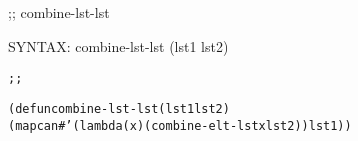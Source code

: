 \begin{aibox}{\function}
;; combine-lst-lst

SYNTAX: combine-lst-lst (lst1 lst2)
\end{aibox}

\begin{aibox}{\examples}
\begin{alltt}
\end{alltt}

\end{aibox}

\begin{aibox}{\comments}

\end{aibox}
\begin{aibox}{\answers}

\end{aibox}
\begin{aibox}{\othercomments}

\end{aibox}
\begin{aibox}{\pseudocode}

\end{aibox}
\begin{aibox}{\code}

\begin{alltt}
;;%% code


(defun combine-lst-lst (lst1 lst2)
            (mapcan #'(lambda (x) (combine-elt-lst x lst2)) lst1))

\end{alltt}
\end{aibox}
